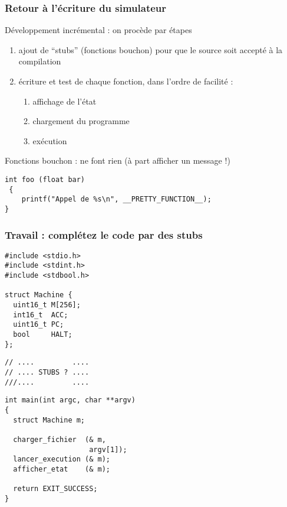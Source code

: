 \documentclass[]{beamer}
\begin{document}
\begin{frame}[containsverbatim]
\frametitle{Retour à l'écriture du simulateur}

Développement incrémental : on procède par étapes 
\begin{enumerate}
\item \alert{ajout de ``stubs}'' (fonctions bouchon) pour que le source
soit accepté à la compilation
\item \alert{écriture et test} de chaque fonction, dans l'ordre de facilité :
\begin{enumerate}
\item affichage de l'état
\item chargement du programme
\item exécution
\end{enumerate}
\end{enumerate}

\alert{Fonctions bouchon} : ne font rien (à part afficher un message !)
\begin{lstlisting}[style=sourcec]
 int foo (float bar) 
 {
    printf("Appel de %s\n", __PRETTY_FUNCTION__);
}
\end{lstlisting}
\end{frame}


\begin{frame}[containsverbatim]
\frametitle{Travail : complétez le code par des stubs}
\footnotesize
\begin{multicols}{2}
\begin{lstlisting}[style=sourcec]
#include <stdio.h>
#include <stdint.h>
#include <stdbool.h>

struct Machine {
  uint16_t M[256];  
  int16_t  ACC;     
  uint16_t PC;      
  bool     HALT;
};
\end{lstlisting}
\break
\begin{lstlisting}[style=sourcec]
// ....         ....
// .... STUBS ? ....
///....         ....
\end{lstlisting}
\begin{lstlisting}[style=sourcec]
int main(int argc, char **argv)
{
  struct Machine m;

  charger_fichier  (& m, 
                    argv[1]);
  lancer_execution (& m);
  afficher_etat    (& m);

  return EXIT_SUCCESS;
}

\end{lstlisting}
\end{multicols}
\end{frame}
\end{document}
